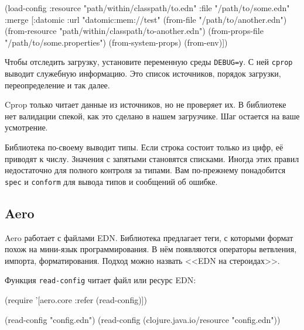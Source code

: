 \begin{english}
  \begin{clojure}
(load-config
 :resource "path/within/classpath/to.edn"
 :file "/path/to/some.edn"
 :merge [{:datomic {:url "datomic:mem://test"}}
         (from-file "/path/to/another.edn")
         (from-resource "path/within/classpath/to-another.edn")
         (from-props-file "/path/to/some.properties")
         (from-system-props)
         (from-env)])
  \end{clojure}
\end{english}

Чтобы отследить загрузку, установите переменную среды \verb|DEBUG=y|. С ней
\verb|cprop| выводит служебную информацию. Это список источников, порядок
загрузки, переопределение и так далее.

Cprop только читает данные из источников, но не проверяет их. В библиотеке нет
валидации спекой, как это сделано в нашем загрузчике. Шаг остается на ваше
усмотрение.

Библиотека по-своему выводит типы. Если строка состоит только из цифр, её
приводят к числу. Значения с запятыми становятся списками. Иногда этих правил
недостаточно для полного контроля за типами. Вам по-прежнему понадобится
\verb|spec| и \verb|conform| для вывода типов и сообщений об ошибке.

\subsection{Aero}


Aero работает с файлами EDN. Библиотека
предлагает теги, с которыми формат похож на мини-язык программирования. В нём
появляются операторы ветвления, импорта, форматирования. Подход можно назвать
<<EDN на стероидах>>.


Функция \verb|read-config| читает файл или ресурс EDN:

\begin{english}
  \begin{clojure}
(require '[aero.core :refer (read-config)])

(read-config "config.edn")
(read-config (clojure.java.io/resource "config.edn"))
  \end{clojure}
\end{english}


